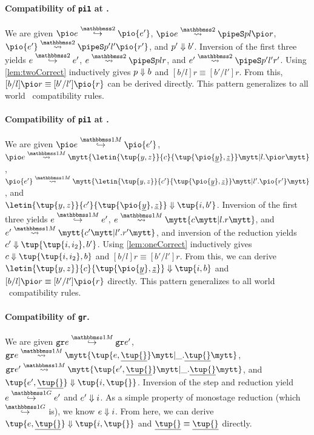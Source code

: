 \begin{abstrsyn}
\paragraph{Compatibility of {\tt pi1} at \bbtwo.}
We are given 
$\steptwo {\pio e} {\pio {e'}}$, 
$\splittwo {\pio e} A p l {\pio r}$, 
$\splittwo {\pio {e'}} A {p'} {l'} {\pio {r'}}$,
and ${p'} \Downarrow {b'}$.
Inversion of the first three yields
$\steptwo e {e'}$, $\splittwo e A p l r$, and $\splittwo {e'} A {p'} {l'} {r'}$.
Using \ref{lem:twoCorrect} inductively gives ${p} \Downarrow {b}$ and $[b/l]r \equiv [b'/l']r$.
From this, $[b/l]\pio r \equiv [b'/l']\pio {r}$ can be derived directly.
This pattern generalizes to all world \bbtwo\ compatibility rules.

\paragraph{Compatibility of {\tt pi1} at \bbonem.}
We are given
$\stepmix {\pio e} {\pio {e'}}$, 
$\splitone {\pio e} A {\letin{\tup{y,z}}{c}{\tup{\pio {\exv y},\exv z}}} {l.\pio r}$, \\
\mbox{$\splitone {\pio {e'}} A {\letin{\tup{y,z}}{c'}{\tup{\pio {\exv y},\exv z}}} {l'.\pio {r'}}$},
and \\ $\reduce {\letin{\tup{y,z}}{c'}{\tup{\pio {\exv y},\exv z}}} {\tup{i,b'}}$.
Inversion of the first three yields 
$\stepmix e {e'}$, $\splitone e A c {l.r}$, and $\splitone {e'} A {c'} {l'.r'}$, 
and inversion of the reduction yields $\reduce {c'} {\tup{\tup{i,i_2},b'}}$.
Using \ref{lem:oneCorrect} inductively gives $\reduce c {\tup{\tup{i,i_2},b}}$ and $[b/l]r \equiv [b'/l']r$.
From this, we can derive $\reduce {\letin{\tup{y,z}}{c}{\tup{\pio {\exv y},\exv z}}} {\tup{i,b}}$ and 
$[b/l]\pio r \equiv [b'/l']\pio {r}$ directly.
This pattern generalizes to all world \bbonem\ compatibility rules.

\paragraph{Compatibility of {\tt gr}.}
We are given 
$\stepmix {\pure e} {\pure {e'}}$, \\
$\splitone {\pure e} A {\tup {e,\exv {\tup{}}}} {\_.\exv{\tup{}}}$, 
$\splitone {\pure {e'}} A {\tup {e',\exv {\tup{}}}} {\_.\exv{\tup{}}}$,
and $\reduce {\tup {e',\exv {\tup{}}}} {\tup{i,\tup{}}}$.
Inversion of the step and reduction yield \mbox{$\steppure e {e'}$} and ${e'} \Downarrow {i}$.
As a simple property of monostage reduction (which $\stepsym \bbonep$ is), we know ${e} \Downarrow {i}$.
From here, we can derive $\reduce {\tup {e,\exv {\tup{}}}} {\tup{i,\tup{}}}$ and $\exv{\tup {}} \equiv \exv{\tup {}}$ directly.




\end{abstrsyn}
